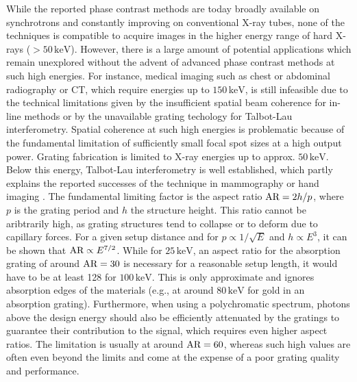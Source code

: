 \documentclass[aip,apl,amsmath,amssymb,floatfix,reprint,a4paper]{revtex4-1}
\newcommand{\unit}[1]{\ensuremath{\, \mathrm{#1}}}
\begin{document}
While the reported phase contrast methods are today broadly available on synchrotrons and constantly improving on conventional X-ray tubes, none of the techniques is compatible to acquire images in the higher energy range of hard X-rays ($>50 \unit{keV}$). However, there is a large amount of potential applications which remain unexplored without the advent of advanced phase contrast methods at such high energies. For instance, medical imaging such as chest or abdominal radiography or CT, which require energies up to $150 \unit{keV}$, is still infeasible due to the technical limitations given by the insufficient spatial beam coherence for in-line methods or by the unavailable grating techology for Talbot-Lau interferometry. Spatial coherence at such high energies is problematic because of the fundamental limitation of sufficiently small focal spot sizes at a high output power. Grating fabrication is limited to X-ray energies up to approx. $50 \unit{keV}$. Below this energy, Talbot-Lau interferometry is well established, which partly explains the reported successes of the technique in mammography \cite{Stampanoni2011} or hand imaging \cite{Thuering2013a}. The fundamental limiting factor is the aspect ratio $\textnormal{AR} = 2h/p$, where $p$ is the grating period and $h$ the structure height. This ratio cannot be aribtrarily high, as grating structures tend to collapse or to deform due to capillary forces. For a given setup distance and for $p \propto 1/\sqrt{E}$ and $h \propto E^3$, it can be shown that $\textnormal{AR} \propto E^{7/2}$. While for $25 \unit{keV}$, an aspect ratio for the absorption grating of around $\textnormal{AR}=30$ is necessary for a reasonable setup length, it would have to be at least 128 for $100 \unit{keV}$. This is only approximate and ignores absorption edges of the materials (e.g., at around $80 \unit{keV}$ for gold in an absorption grating). Furthermore, when using a polychromatic spectrum, photons above the design energy should also be efficiently attenuated by the gratings to guarantee their contribution to the signal, which requires even higher aspect ratios. The limitation is usually at around $\textnormal{AR} = 60$, whereas such high values are often even beyond the limits and come at the expense of a poor grating quality and performance.
\end{document}
